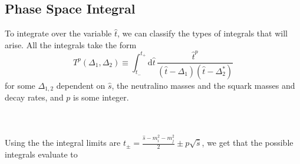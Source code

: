 \documentclass[../main.tex]{subfiles}
\begin{document}
\subsection{Phase Space Integral}
To integrate over the variable \(\hat{t}\), we can classify the types of
integrals that will arise. All the integrals take the form
\begin{equation}
  T^p(\Delta_1, \Delta_2) \equiv \int_{t_-}^{t_+} \!\mathrm{d}\hat{t}\,
  \frac{\hat{t}^p}{(\hat{t}-\Delta_1)(\hat{t}-\Delta_2^\ast)}
\end{equation}
for some \(\Delta_{1,2}\) dependent on \(\hat{s}\), the neutralino masses and
the squark masses and decay rates, and \(p\) is some integer.

\\
\\
Using the the integral limits are \(t_\pm = \frac{\hat{s} - m_i^2 - m_j^2}{2}
\pm p\sqrt{\hat{s}}\), we get that the possible integrals evaluate to
\end{document}
